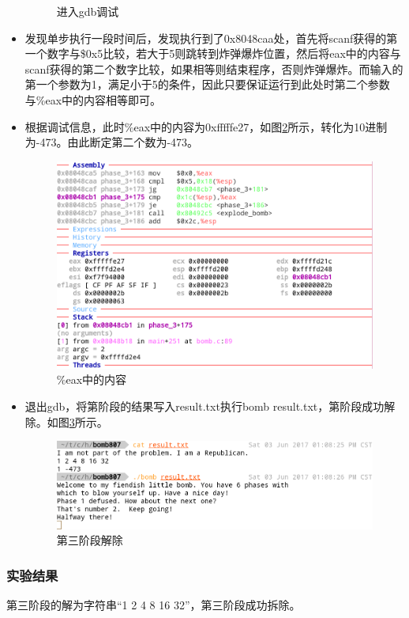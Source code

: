 \begin{itemize}
\begin{figure}[H]
			\caption{进入gdb调试}
			\label{fig:fig5}
		\end{figure}
	\item 发现单步执行一段时间后，发现执行到了0x8048caa处，首先将scanf获得的第一个数字与\$0x5比较，若大于5则跳转到炸弹爆炸位置，然后将eax中的内容与scanf获得的第二个数字比较，如果相等则结束程序，否则炸弹爆炸。而输入的第一个参数为1，满足小于5的条件，因此只要保证运行到此处时第二个参数与\%eax中的内容相等即可。
	\item 根据调试信息，此时\%eax中的内容为0xfffffe27，如图\ref{fig:fig6}所示，转化为10进制为-473。由此断定第二个数为-473。
		\begin{figure}[H]
			\centering
			\includegraphics[width=0.95\linewidth]{resources/fig6.png}
			\caption{\%eax中的内容}
			\label{fig:fig6}
		\end{figure}
	\item 退出gdb，将第阶段的结果写入result.txt执行bomb result.txt，第阶段成功解除。如图\ref{fig:fig7}所示。
		\begin{figure}[H]
			\centering
			\includegraphics[width=0.95\linewidth]{resources/fig7.png}
			\caption{第三阶段解除}
			\label{fig:fig7}
		\end{figure}
\end{itemize}

\subsubsection{实验结果}
第三阶段的解为字符串``1 2 4 8 16 32''，第三阶段成功拆除。


